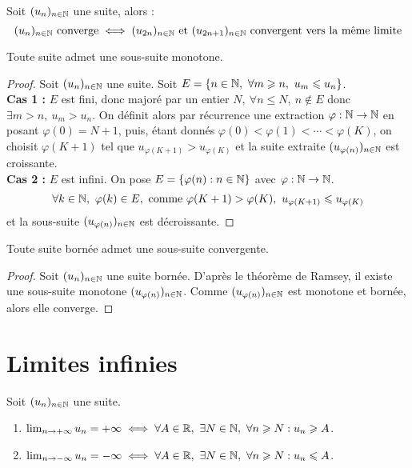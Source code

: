 \begin{proposition}
    Soit $(u_n)_{n \in \mathbb{N}}$ une suite, alors :
    \[ (u_n)_{n \in \mathbb{N}} \text{ converge} \iff (u_{2n})_{n \in \mathbb{N}} \text{ et } (u_{2n + 1})_{n \in \mathbb{N}} \text{ convergent vers la même limite} \]
\end{proposition}

\begin{theorem}
    Toute suite admet une sous-suite monotone.
\end{theorem}

\begin{proof}
    Soit $(u_n)_{n \in \mathbb{N}}$ une suite. Soit $E = \{ n \in \N,\ \forall m \geq n,\ u_m \leq u_n \}$.
    \\ 
    \textbf{Cas 1 :} $E$ est fini, donc majoré par un entier $N,\ \forall n \leq N,\ n \notin E$ donc $\exists m > n,\ u_m > u_n$. On définit alors par récurrence une extraction $\varphi : \mathbb{N} \to \mathbb{N}$ en posant $\varphi(0) = N + 1$, puis, étant donnés $\varphi(0) < \varphi(1) < \cdots < \varphi(K)$, on choisit $\varphi(K + 1)$ tel que $u_{\varphi(K+1)} > u_{\varphi(K)}$ et la suite extraite $(u_{\varphi(n)})_{n \in \mathbb{N}}$ est croissante.
    \\ 
    \textbf{Cas 2 :} $E$ est infini. On pose $E = \{ \varphi(n) : n \in \mathbb{N} \}$ avec $\varphi : \mathbb{N} \to \mathbb{N}$.
    \[ \forall k \in \mathbb{N},\ \varphi(k) \in E, \text{ comme } \varphi(K + 1) > \varphi(K),\ u_{\varphi(K+1)} \leqslant u_{\varphi(K)} \]
    et la sous-suite $(u_{\varphi(n)})_{n \in \mathbb{N}}$ est décroissante.
\end{proof}

\begin{theorem}
    Toute suite bornée admet une sous-suite convergente.
\end{theorem}

\begin{proof}
    Soit $(u_n)_{n \in \mathbb{N}}$ une suite bornée. D'après le théorème de Ramsey, il existe une sous-suite monotone $(u_{\varphi(n)})_{n \in \mathbb{N}}$. Comme $(u_{\varphi(n)})_{n \in \mathbb{N}}$ est monotone et bornée, alors elle converge.
\end{proof}

\section{Limites infinies}

\begin{definition}
    Soit $(u_n)_{n \in \mathbb{N}}$ une suite.
    \begin{enumerate}
        \item $\lim_{n \to +\infty} u_n = +\infty \iff \forall A \in \mathbb{R},\ \exists N \in \mathbb{N},\ \forall n \geqslant N : u_n \geqslant A$.
        \item $\lim_{n \to -\infty} u_n = -\infty \iff \forall A \in \mathbb{R},\ \exists N \in \mathbb{N},\ \forall n \geqslant N : u_n \leqslant A$.
    \end{enumerate}
\end{definition}

